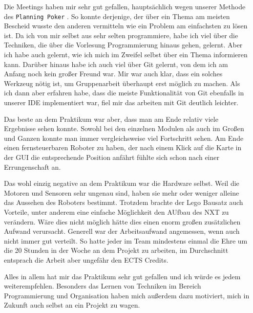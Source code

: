 \documentclass[oneside,abstractoff,a4paper]{scrartcl}
\begin{document}
Die Meetings haben mir sehr gut gefallen, hauptsächlich wegen unserer Methode des \texttt{Planning Poker} . So konnte derjenige, der über ein Thema am meisten Bescheid wusste den anderen vermitteln wie ein Problem am einfachsten zu lösen ist. Da ich von mir selbst aus sehr selten programmiere, habe ich viel über die Techniken, die über die Vorlesung Programmierung hinaus gehen, gelernt. Aber ich habe auch gelernt, wie ich mich im Zweifel selbst über ein Thema informieren kann. Darüber hinaus habe ich auch viel über Git gelernt, von dem ich am Anfang noch kein großer Freund war. Mir war auch klar, dass ein solches Werkzeug nötig ist, um Gruppenarbeit überhaupt erst möglich zu machen. Als ich dann aber erfahren habe, dass die meiste Funktionalität von Git ebenfalls in unserer IDE implementiert war, fiel mir das arbeiten mit Git deutlich leichter. 

Das beste an dem Praktikum war aber, dass man am Ende relativ viele Ergebnisse sehen konnte. Sowohl bei den einzelnen Modulen als auch im Großen und Ganzen konnte man immer vergleichsweise viel Fortschritt sehen. Am Ende einen fernsteuerbaren Roboter zu haben, der nach einem Klick auf die Karte in der GUI die entsprechende Position anfährt fühlte sich schon nach einer Errungenschaft an. 

Das wohl einzig negative an dem Praktikum war die Hardware selbst. Weil die Motoren und Sensoren sehr ungenau sind, haben sie mehr oder weniger alleine das Aussehen des Roboters bestimmt.
Trotzdem brachte der Lego Bausatz auch Vorteile, unter anderem eine einfache Möglichkeit den AUfbau des NXT zu verändern. Wäre dies nicht möglich hätte dies einen enorm großen zusätzlichen Aufwand verursacht. Generell war der Arbeitsaufwand angemessen, wenn auch nicht immer gut verteilt. So hatte jeder im Team mindestens einmal die Ehre um die 20 Stunden in der Woche an dem Projekt zu arbeiten, im Durchschnitt entsprach die Arbeit aber ungefähr den ECTS Credits. 

Alles in allem hat mir das Praktikum sehr gut gefallen und ich würde es jedem weiterempfehlen. Besonders das Lernen von Techniken im Bereich Programmierung und Organisation haben mich außerdem dazu motiviert, mich in Zukunft auch selbst an ein Projekt zu wagen.
\end{document}
